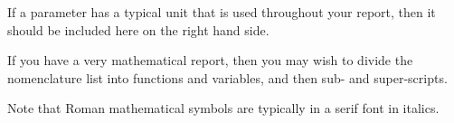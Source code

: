 \documentclass[a4paper,oneside,12pt]{book}
\begin{document}
If a parameter has a typical unit that is used throughout your report, then it should be included here on the right hand side.

If you have a very mathematical report, then you may wish to divide the nomenclature list into functions and variables, and then sub- and super-scripts.

Note that Roman mathematical symbols are typically in a serif font in italics.

\mainmatter







\appendix
\renewcommand{\thechapter}{A\arabic{chapter}}

\end{document}
